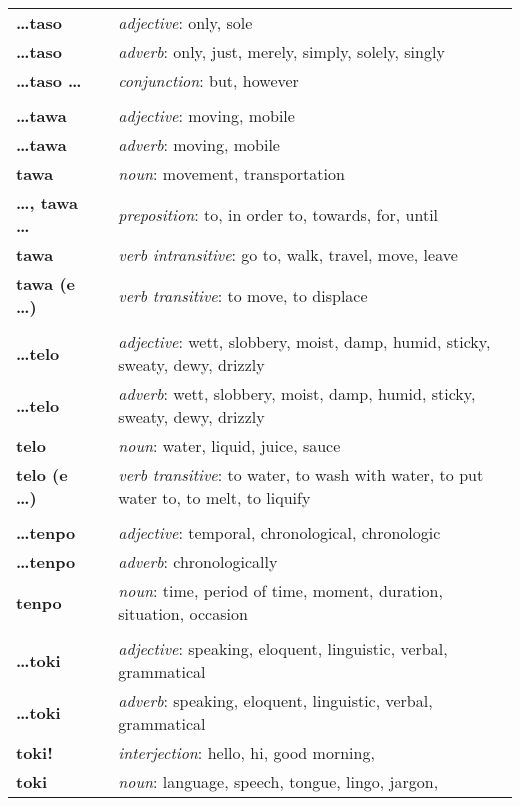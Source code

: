 \begin{supertabular}{p{2,5cm}|ll}
\textbf{\dots taso} && \textit{adjective}: only, sole \\ 
\textbf{\dots taso} && \textit{adverb}: only, just, merely, simply, solely, singly \\ 
\textbf{\dots taso \dots} && \textit{conjunction}: but, however \\ 
 && \\ %
\textbf{\dots tawa} && \textit{adjective}: moving, mobile \\ 
\textbf{\dots tawa} && \textit{adverb}: moving, mobile \\ 
\textbf{tawa} && \textit{noun}: movement, transportation \\ 
\textbf{\dots , tawa \dots} && \textit{preposition}: to, in order to, towards, for, until \\ 
\textbf{tawa} && \textit{verb intransitive}: go to, walk, travel, move, leave \\ 
\textbf{tawa (e \dots)} && \textit{verb transitive}: to move, to displace \\ 
 && \\ %
\textbf{\dots telo} && \textit{adjective}: wett, slobbery, moist, damp, humid, sticky, sweaty, dewy, drizzly \\ 
\textbf{\dots telo} && \textit{adverb}: wett, slobbery, moist, damp, humid, sticky, sweaty, dewy, drizzly \\ 
\textbf{telo} && \textit{noun}: water, liquid, juice, sauce \\ 
\textbf{telo (e \dots)} && \textit{verb transitive}: to water, to wash with water, to put water to, to melt, to liquify \\ 
 && \\ %
\textbf{\dots tenpo} && \textit{adjective}: temporal, chronological, chronologic \\ 
\textbf{\dots tenpo} && \textit{adverb}: chronologically \\ 
\textbf{tenpo} && \textit{noun}: time, period of time, moment, duration, situation, occasion \\ 
 && \\ %
\textbf{\dots toki} && \textit{adjective}: speaking, eloquent, linguistic, verbal, grammatical \\ 
\textbf{\dots toki} && \textit{adverb}: speaking, eloquent, linguistic, verbal, grammatical \\ 
\textbf{toki!} && \textit{interjection}: hello, hi, good morning, \\ 
\textbf{toki} && \textit{noun}: language, speech, tongue, lingo, jargon, \\ 

\end{supertabular}
